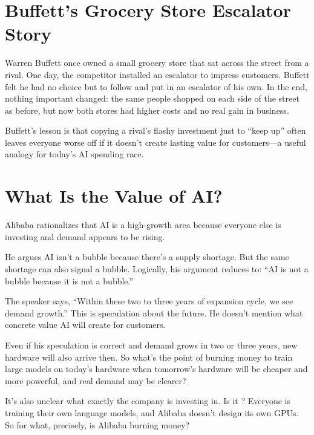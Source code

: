 \section{Buffett's Grocery Store Escalator Story}

Warren Buffett once owned a small grocery store that sat across the street from a rival. One day, the competitor installed an escalator to impress customers. Buffett felt he had no choice but to follow and put in an escalator of his own. In the end, nothing important changed: the same people shopped on each side of the street as before, but now both stores had higher costs and no real gain in business.

Buffett’s lesson is that copying a rival’s flashy investment just to ``keep up'' often leaves everyone worse off if it doesn’t create lasting value for customers—a useful analogy for today’s AI spending race.\nocite{buffett_escalator_ai}

\section{What Is the Value of AI?}

Alibaba rationalizes that AI is a high-growth area because everyone else is investing and demand appears to be rising.

He argues AI isn't a bubble because there's a supply shortage. But the same shortage can also signal a bubble. Logically, his argument reduces to: ``AI is not a bubble because it is not a bubble.''

The speaker says, ``Within these two to three years of expansion cycle, we see demand growth.'' This is speculation about the future. He doesn't mention what concrete value AI will create for customers.

Even if his speculation is correct and demand grows in two or three years, new hardware will also arrive then. So what's the point of burning money to train large models on today's hardware when tomorrow's hardware will be cheaper and more powerful, and real demand may be clearer?

It's also unclear what exactly the company is investing in. Is it ? Everyone is training their own language models, and Alibaba doesn't design its own GPUs. So for what, precisely, is Alibaba burning money? 


